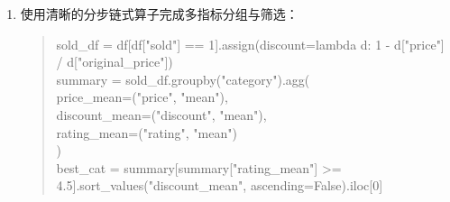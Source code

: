 \begin{exercise}[title={校园二手书市场 EDA 综合分析流水线},level=advanced,points=20,tags={EDA,Pandas,NumPy,综合分析}]
\begin{solution}
\begin{enumerate}
\begin{quote}
    df["value\_score"] = df["views"] / df["price"]\\
    top5\_idx = np.argsort(df["value\_score"].to\_numpy())[-5:][::-1]\\
    top5 = df.iloc[top5\_idx][["title", "price", "views", "value\_score"]]
  \end{quote}
  \item 使用清晰的分步链式算子完成多指标分组与筛选：
  \begin{quote}\ttfamily\small
    sold\_df = df[df["sold"] == 1].assign(discount=lambda d: 1 - d["price"] / d["original\_price"])\\
    summary = sold\_df.groupby("category").agg(\\
    \hspace*{2em}price\_mean=("price", "mean"),\\
    \hspace*{2em}discount\_mean=("discount", "mean"),\\
    \hspace*{2em}rating\_mean=("rating", "mean")\\
    )\\
    best\_cat = summary[summary["rating\_mean"] >= 4.5].sort\_values("discount\_mean", ascending=False).iloc[0]
  \end{quote}
\end{enumerate}
\end{solution}
\end{exercise}
